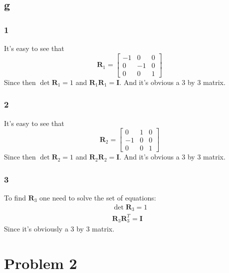 \documentclass[11pt]{article}
\begin{document}
\subsection*{g}
\subsubsection*{1}
It's easy to see that 
\[\mathbf{R}_1 = \begin{bmatrix}
-1 & 0 & 0 \\
0 & -1 & 0 \\
0 & 0 & 1
\end{bmatrix}
\]
Since then $\det{\mathbf{R}_1} = 1$ and $\mathbf{R}_1 \mathbf{R}_1 = \mathbf{I}$. And it's obvious a 3 by 3 matrix.

\subsubsection*{2}
It's easy to see that 
\[\mathbf{R}_2 = \begin{bmatrix}
0 & 1 & 0 \\
-1 & 0 & 0 \\
0 & 0 & 1
\end{bmatrix}
\]
Since then $\det{\mathbf{R}_2} = 1$ and $\mathbf{R}_2 \mathbf{R}_2 = \mathbf{I}$. And it's obvious a 3 by 3 matrix.

\subsubsection*{3}
To find $\mathbf{R}_3$ one need to solve the set of equations:
\begin{eqnarray*}
\det{\mathbf{R}_3} = 1 \\
\mathbf{R}_3 \mathbf{R}_3^T = \mathbf{I}
\end{eqnarray*}
Since it's obviously a 3 by 3 matrix.

\section*{Problem 2}
\end{document}
